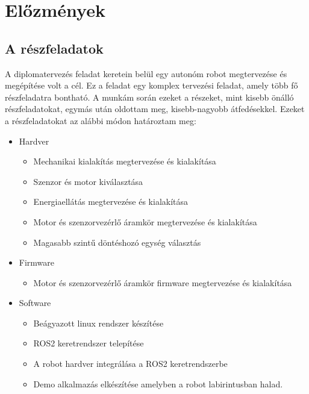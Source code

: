 \chapter{Előzmények}



\section{A részfeladatok}

A diplomatervezés feladat keretein belül egy autonóm robot megtervezése és
megépítése volt a cél. Ez a feladat egy komplex tervezési feladat, amely több fő
részfeladatra bontható. A munkám során ezeket a részeket, mint kisebb önálló
részfeladatokat, egymás után oldottam meg, kisebb-nagyobb átfedésekkel. Ezeket a
részfeladatokat az alábbi módon határoztam meg:

\begin{itemize}
\item Hardver
  \begin{itemize}
  \item Mechanikai kialakítás megtervezése és kialakítása
  \item Szenzor és motor kiválasztása
  \item Energiaellátás megtervezése és kialakítása
  \item Motor és szenzorvezérlő áramkör megtervezése és kialakítása
  \item Magasabb szintű döntéshozó egység választás
  \end{itemize}
\item{Firmware}
  \begin{itemize}
  \item Motor és szenzorvezérlő áramkör firmware megtervezése és kialakítása
  \end{itemize}
\item{Software}
  \begin{itemize}
  \item Beágyazott linux rendszer készítése
  \item ROS2 keretrendszer telepítése
  \item A robot hardver integrálása a ROS2 keretrendszerbe
  \item Demo alkalmazás elkészítése amelyben a robot labirintusban halad.
  \end{itemize}
\end{itemize}

